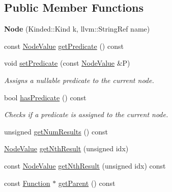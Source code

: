 \subsection*{Public Member Functions}
\begin{DoxyCompactItemize}
\item 
\mbox{\label{classglow_1_1_node_a763bc613775e465454739bec23862f0c}} 
{\bfseries Node} (Kinded\+::\+Kind k, llvm\+::\+String\+Ref name)
\item 
const \hyperlink{structglow_1_1_node_value}{Node\+Value} \hyperlink{classglow_1_1_node_aa8d2dcebd65cef8d43ca2e90f3b59d05}{get\+Predicate} () const
\item 
\mbox{\label{classglow_1_1_node_ab626908f81e8d10eb4f42376ecb152eb}} 
void \hyperlink{classglow_1_1_node_ab626908f81e8d10eb4f42376ecb152eb}{set\+Predicate} (const \hyperlink{structglow_1_1_node_value}{Node\+Value} \&P)
\begin{DoxyCompactList}\small\item\em Assigns a nullable predicate to the current node. \end{DoxyCompactList}\item 
\mbox{\label{classglow_1_1_node_a36202286cf4467a177d8e1844d9e9f0a}} 
bool \hyperlink{classglow_1_1_node_a36202286cf4467a177d8e1844d9e9f0a}{has\+Predicate} () const
\begin{DoxyCompactList}\small\item\em Checks if a predicate is assigned to the current node. \end{DoxyCompactList}\item 
unsigned \hyperlink{classglow_1_1_node_ac3b7b40d0aaef77d50648124cf310bbb}{get\+Num\+Results} () const
\item 
\hyperlink{structglow_1_1_node_value}{Node\+Value} \hyperlink{classglow_1_1_node_a2bcdbc1727fd5ee405409168fe834f5f}{get\+Nth\+Result} (unsigned idx)
\item 
const \hyperlink{structglow_1_1_node_value}{Node\+Value} \hyperlink{classglow_1_1_node_aa570f3b0b2125e3b18b125d3c557f12b}{get\+Nth\+Result} (unsigned idx) const
\item 
const \hyperlink{classglow_1_1_function}{Function} $\ast$ \hyperlink{classglow_1_1_node_a11974fd21979f60789e6c02533e17fda}{get\+Parent} () const
\item 
\mbox{\label{classglow_1_1_node_aca46f50522cc94fa461869821552adb7}} 

\end{DoxyCompactItemize}
